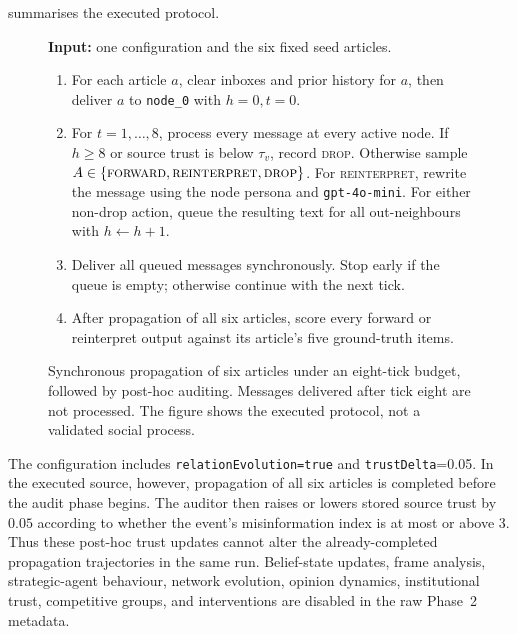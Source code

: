  summarises the executed protocol.
\begin{figure}[tbp]
  \centering
  \begin{minipage}{0.94\textwidth}
    \small
    \textbf{Input:} one configuration and the six fixed seed articles.
    \begin{enumerate}
      \item For each article \(a\), clear inboxes and prior history for \(a\),
      then deliver \(a\) to \texttt{node\_0} with \(h=0,t=0\).
      \item For \(t=1,\ldots,8\), process every message at every active node.
      If \(h\geq8\) or source trust is below \(\tau_v\), record
      \textsc{drop}.  Otherwise sample
      \(A\in\{\textsc{forward},\textsc{reinterpret},\textsc{drop}\}\).
      For \textsc{reinterpret}, rewrite the message using the node persona and
      \texttt{gpt-4o-mini}.  For either non-drop action, queue the resulting
      text for all out-neighbours with \(h\leftarrow h+1\).
      \item Deliver all queued messages synchronously.  Stop early if the
      queue is empty; otherwise continue with the next tick.
      \item After propagation of all six articles, score every forward or
      reinterpret output against its article's five ground-truth items.
    \end{enumerate}
  \end{minipage}
  \caption{Synchronous propagation of six articles under an eight-tick budget,
  followed by post-hoc auditing. Messages delivered after tick eight are not
  processed. The figure shows the executed protocol, not a validated social
  process.}
  \label{fig:simulation-pseudocode}
\end{figure}

The configuration includes \texttt{relationEvolution=true} and
\texttt{trustDelta}=0.05.  In the executed source, however, propagation of all
six articles is completed before the audit phase begins.  The auditor then
raises or lowers stored source trust by \(0.05\) according to whether the
event's misinformation index is at most or above 3.  Thus these post-hoc trust
updates cannot alter the already-completed propagation trajectories in the
same run.  Belief-state updates, frame analysis, strategic-agent behaviour,
network evolution, opinion dynamics, institutional trust, competitive groups,
and interventions are disabled in the raw Phase~2 metadata.

